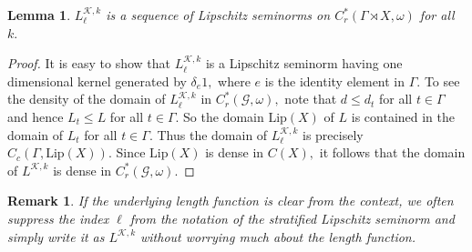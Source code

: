 \documentclass[a4paper,11pt,reqno]{amsart}
\theoremstyle{plain}
\newtheorem{lem}[thm]{Lemma}
\newtheorem{rem}[thm]{Remark}
\theoremstyle{mainthmstyle}
\theoremstyle{named}
\numberwithin{equation}{section}
\begin{document}
\begin{lem}
    $L^{\mathcal{K},k}_{\ell}$ is a sequence of Lipschitz seminorms on $C^{\ast}_{r}(\Gamma\rtimes X,\omega)$ for all $k.$
\end{lem}
\begin{proof}
     It is easy to show that $L^{\mathcal K, k}_{\ell}$ is a Lipschitz seminorm having one dimensional kernel generated by $\delta_{e} 1,$ where $e$ is the identity element in $\Gamma.$ To see the density of the domain of $L^{\mathcal K, k}_{\ell}$ in $C_r^{\ast} (\mathcal G, \omega),$ note that $d \leq d_t$ for all $t \in \Gamma$ and hence $L_t \leq L$ for all $t \in \Gamma.$ So the domain $\mathrm {Lip} (X)$ of $L$ is contained in the domain of $L_t$ for all $t \in \Gamma.$ Thus the domain of $L^{\mathcal K, k}_{\ell}$ is precisely $C_c (\Gamma, \mathrm {Lip} (X)).$ Since $\mathrm {Lip} (X)$ is dense in $C (X),$ it follows that the domain of $L^{\mathcal K, k}$ is dense in $C_r^{\ast} (\mathcal G, \omega).$
\end{proof}

\begin{rem}
If the underlying length function is clear from the context, we often suppress the index $\ell$ from the notation of the stratified Lipschitz seminorm and simply write it as $L^{\mathcal K, k}$ without worrying much about the length function.
\end{rem}
\end{document}
